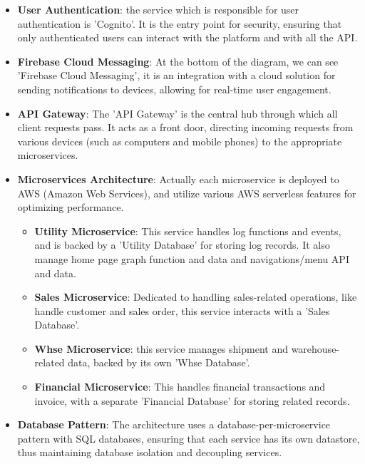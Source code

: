 \begin{itemize}
    \item \textbf{User Authentication}: the service which is responsible for user authentication is
          'Cognito'. It is the entry point for security, ensuring that only authenticated users can
          interact with the platform and with all the API.

    \item \textbf{Firebase Cloud Messaging}: At the bottom of the diagram, we can see 'Firebase Cloud Messaging',
          it is an integration with a cloud solution for sending notifications to devices, allowing for
          real-time user engagement.

    \item \textbf{API Gateway}: The 'API Gateway' is the central hub through which all client
          requests pass. It acts as a front door, directing incoming requests from various devices (such as
          computers and mobile phones) to the appropriate microservices.

    \item \textbf{Microservices Architecture}: Actually each microservice is deployed to AWS (Amazon
          Web Services), and utilize various AWS serverless features for optimizing performance.

          \begin{itemize}
              \item \textbf{Utility Microservice}: This service handles log functions and events,
                    and is backed by a 'Utility Database' for storing log records. It also manage
                    home page graph function and data and navigations/menu API and data.
              \item \textbf{Sales Microservice}: Dedicated to handling sales-related operations,
                    like handle customer and sales order, this service interacts with a 'Sales
                    Database'.
              \item \textbf{Whse Microservice}: this service manages shipment and warehouse-related
                    data, backed by its own 'Whse Database'.
              \item \textbf{Financial Microservice}: This handles financial transactions and invoice, with a
                    separate 'Financial Database' for storing related records.
          \end{itemize}

    \item \textbf{Database Pattern}: The architecture uses a database-per-microservice pattern with SQL
          databases, ensuring that each service has its own datastore, thus maintaining database isolation and
          decoupling services.


\end{itemize}
